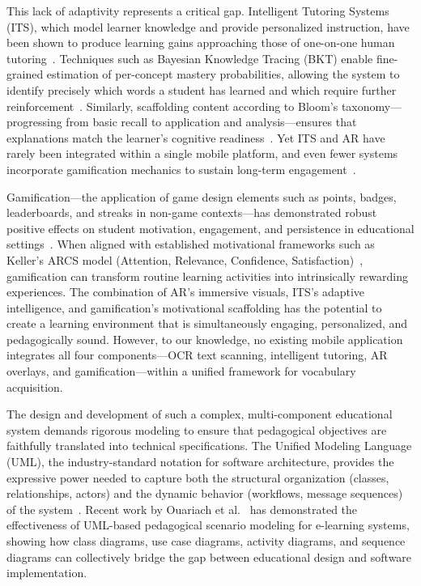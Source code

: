 This lack of adaptivity represents a critical gap. Intelligent Tutoring Systems (ITS), which model learner knowledge and provide personalized instruction, have been shown to produce learning gains approaching those of one-on-one human tutoring~\cite{VanLehn2011,Anderson2001}. Techniques such as Bayesian Knowledge Tracing (BKT) enable fine-grained estimation of per-concept mastery probabilities, allowing the system to identify precisely which words a student has learned and which require further reinforcement~\cite{Corbett1994}. Similarly, scaffolding content according to Bloom's taxonomy---progressing from basic recall to application and analysis---ensures that explanations match the learner's cognitive readiness~\cite{Bloom1956,Krathwohl2002}. Yet ITS and AR have rarely been integrated within a single mobile platform, and even fewer systems incorporate gamification mechanics to sustain long-term engagement~\cite{Dey2018,Klopfer2012}.

Gamification---the application of game design elements such as points, badges, leaderboards, and streaks in non-game contexts---has demonstrated robust positive effects on student motivation, engagement, and persistence in educational settings~\cite{Deterding2011,Hamari2014,Sailer2017}. When aligned with established motivational frameworks such as Keller's ARCS model (Attention, Relevance, Confidence, Satisfaction)~\cite{Keller2010}, gamification can transform routine learning activities into intrinsically rewarding experiences. The combination of AR's immersive visuals, ITS's adaptive intelligence, and gamification's motivational scaffolding has the potential to create a learning environment that is simultaneously engaging, personalized, and pedagogically sound. However, to our knowledge, no existing mobile application integrates all four components---OCR text scanning, intelligent tutoring, AR overlays, and gamification---within a unified framework for vocabulary acquisition.

The design and development of such a complex, multi-component educational system demands rigorous modeling to ensure that pedagogical objectives are faithfully translated into technical specifications. The Unified Modeling Language (UML), the industry-standard notation for software architecture, provides the expressive power needed to capture both the structural organization (classes, relationships, actors) and the dynamic behavior (workflows, message sequences) of the system~\cite{Booch2005,Rumbaugh2004}. Recent work by Ouariach et al.~\cite{Ouariach2023,Ouariach2025,Ouariach2026} has demonstrated the effectiveness of UML-based pedagogical scenario modeling for e-learning systems, showing how class diagrams, use case diagrams, activity diagrams, and sequence diagrams can collectively bridge the gap between educational design and software implementation.

